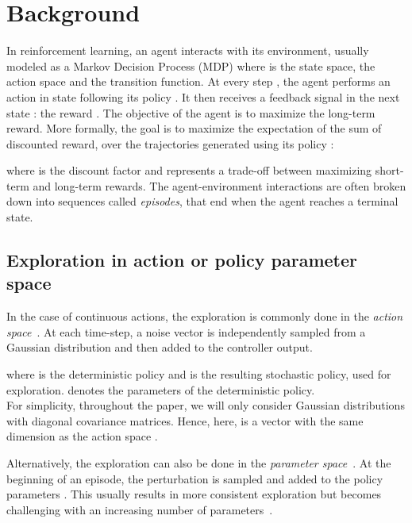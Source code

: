 \documentclass{article}
\begin{document}
\section{Background}
\label{sec:background}

In reinforcement learning, an agent interacts with its environment, usually modeled as a Markov Decision Process (MDP)  where  is the state space,  the action space and  the transition function. At every step , the agent performs an action  in state  following its policy . It then receives a feedback signal in the next state : the reward . The objective of the agent is to maximize the long-term reward. More formally, the goal is to maximize the expectation of the sum of discounted reward, over the trajectories  generated using its policy :



where  is the discount factor and represents a trade-off between maximizing short-term and long-term rewards.
The agent-environment interactions are often broken down into sequences called \textit{episodes}, that end when the agent reaches a terminal state.

\subsection{Exploration in action or policy parameter space}

In the case of continuous actions, the exploration is commonly done in the \textit{action space}~\citep{schulman2015trust, lillicrap2015continuous, mnih2016asynchronous, schulman2017proximal, haarnoja2017reinforcement, fujimoto2018addressing}. At each time-step, a noise vector  is independently sampled from a Gaussian distribution and then added to the controller output.



where  is the deterministic policy and  is the resulting stochastic policy, used for exploration.  denotes the parameters of the deterministic policy.\\
For simplicity, throughout the paper, we will only consider Gaussian distributions with diagonal covariance matrices. Hence, here,  is a vector with the same dimension as the action space .

Alternatively, the exploration can also be done in the \textit{parameter space}~\citep{ruckstiess2010exploring, plappert2017parameter, pourchot2018cem, khadka2018evolution}. At the beginning of an episode, the perturbation  is sampled and added to the policy parameters .
This usually results in more consistent exploration but becomes challenging with an increasing number of parameters~\citep{plappert2017parameter}.
\end{document}
